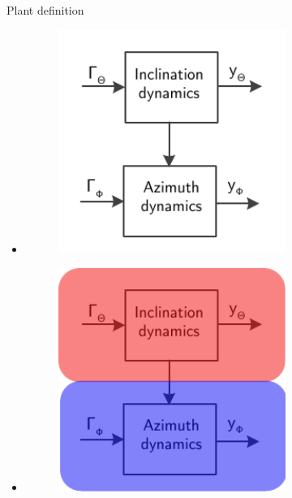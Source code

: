 \documentclass[10pt]{beamer}
\begin{document}
\begin{frame}{Plant definition}\setlength{\leftmargini}{0pt}
\begin{itemize} 
				\item <1|only@1> [] \begin{figure}[ht]\centering
				\includegraphics[width=0.7\textwidth]{images/Plant.pdf}
			\end{figure}
			\item <2|only@2> [] \begin{figure}[ht]\centering
				\includegraphics[width=0.7\textwidth]{images/Plant2.pdf}
			\end{figure}
\end{itemize}
\end{frame}
\end{document}
